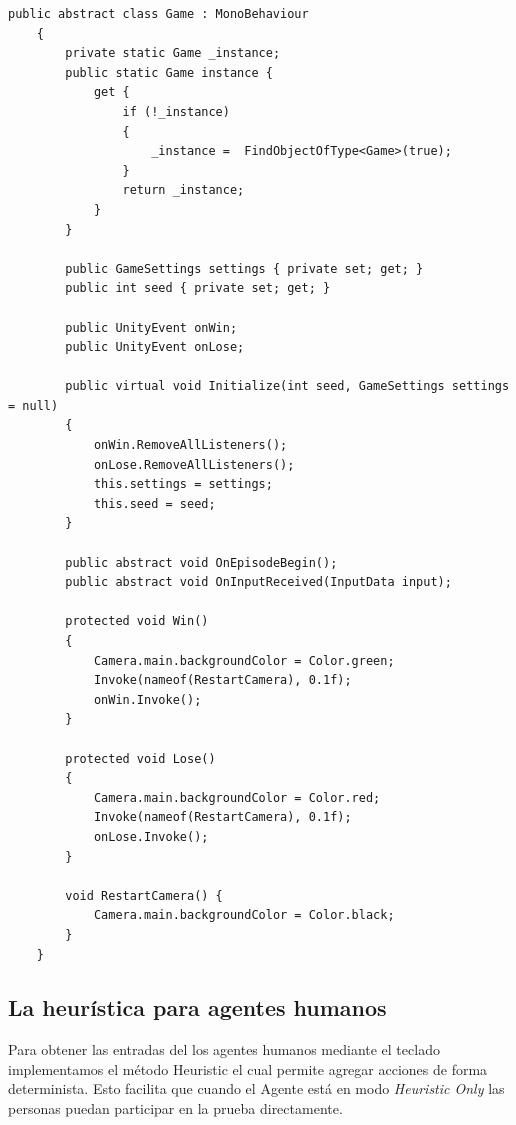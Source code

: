 \begin{lstlisting}[caption={Implementación de la clase \lstinline{Game} base para todos los juegos de UTHOPIA}]
    public abstract class Game : MonoBehaviour
    {
        private static Game _instance;
        public static Game instance {
            get {
                if (!_instance)
                {
                    _instance =  FindObjectOfType<Game>(true);
                }
                return _instance;
            }
        }
 
        public GameSettings settings { private set; get; }
        public int seed { private set; get; }
 
        public UnityEvent onWin;
        public UnityEvent onLose;
 
        public virtual void Initialize(int seed, GameSettings settings = null)
        {
            onWin.RemoveAllListeners();
            onLose.RemoveAllListeners();
            this.settings = settings;
            this.seed = seed;
        }
 
        public abstract void OnEpisodeBegin();
        public abstract void OnInputReceived(InputData input);
 
        protected void Win()
        {
            Camera.main.backgroundColor = Color.green;
            Invoke(nameof(RestartCamera), 0.1f);
            onWin.Invoke();
        }
 
        protected void Lose()
        {
            Camera.main.backgroundColor = Color.red;
            Invoke(nameof(RestartCamera), 0.1f);
            onLose.Invoke();
        }
 
        void RestartCamera() {
            Camera.main.backgroundColor = Color.black;
        }
    }
\end{lstlisting}
 
\subsection{La heurística para agentes humanos}
 
Para obtener las entradas del los agentes humanos mediante el teclado implementamos el método Heuristic el cual permite agregar acciones de forma determinista. Esto facilita que cuando el Agente está en modo \textit{Heuristic Only} las personas puedan participar en la prueba directamente.
 
\vspace*{1cm}
 
